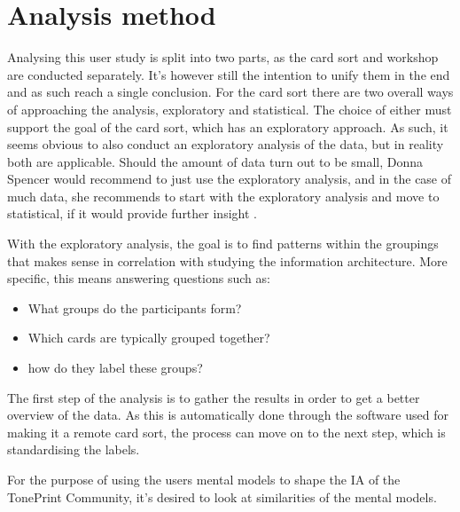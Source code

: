 \section{Analysis method}
\label{AnalysisMethod}
Analysing this user study is split into two parts, as the card sort and workshop are conducted separately. It's however still the intention to unify them in the end and as such reach a single conclusion. For the card sort there are two overall ways of approaching the analysis, exploratory and statistical. The choice of either must support the goal of the card sort, which has an exploratory approach. As such, it seems obvious to also conduct an exploratory analysis of the data, but in reality both are applicable. Should the amount of data turn out to be small, Donna Spencer would recommend to just use the exploratory analysis, and in the case of much data, she recommends to start with the exploratory analysis and move to statistical, if it would provide further insight \parencite[][177]{WEB:DonnaSpencer}.

With the exploratory analysis, the goal is to find patterns within the groupings that makes sense in correlation with studying the information architecture. More specific, this means answering questions such as:
%
\begin{itemize}
	\item What groups do the participants form?
	\item Which cards are typically grouped together?
	\item how do they label these groups?
\end{itemize}
%
\noindent
The first step of the analysis is to gather the results in order to get a better overview of the data. As this is automatically done through the software used for making it a remote card sort, the process can move on to the next step, which is standardising the labels.








\noindent
For the purpose of using the users mental models to shape the IA of the TonePrint Community, it's desired to look at similarities of the mental models.

